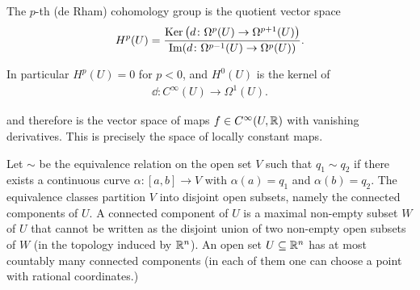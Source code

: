 \begin{definition}\label{def:3-8}
The $p$-th (de Rham) cohomology group is the quotient vector space
\begin{align*}
  H^p(U) 
  = \frac {\operatorname{Ker}\big(d\colon\Omega^p(U)\to\Omega^{p+1}(U)\big)}
          {\operatorname{Im}(d\colon\Omega^{p-1}(U)\to\Omega^p(U))}.
\end{align*}

In particular $H^p(U) = 0$ for $p<0$, and $H^0(U)$ is the kernel of
\begin{align*}
  \dd:C^\infty(U)\to\Omega^1(U).
\end{align*}

and therefore is the vector space of maps $f\in C^\infty(U, \mathbb{R})$ with vanishing 
derivatives. This is precisely the space of locally constant maps.

Let $\sim$ be the equivalence relation on the open set $V$ such that $q_1\sim q_2$ if there
exists a continuous curve $\alpha: [a, b]\to V$ with $\alpha(a) = q_1$ and $\alpha(b) = q_2$. The
equivalence classes partition $V$ into disjoint open subsets, namely the connected components of $U$. 
A connected component of $U$ is a maximal non-empty subset $W$ of $U$ that cannot be written as the 
disjoint union of two non-empty open subsets of $W$ (in the topology induced by $\mathbb{R}^n$). An open 
set $U\subseteq\mathbb{R}^n$ has at most countably many connected components (in each of them one can choose 
a point with rational coordinates.)
\end{definition}